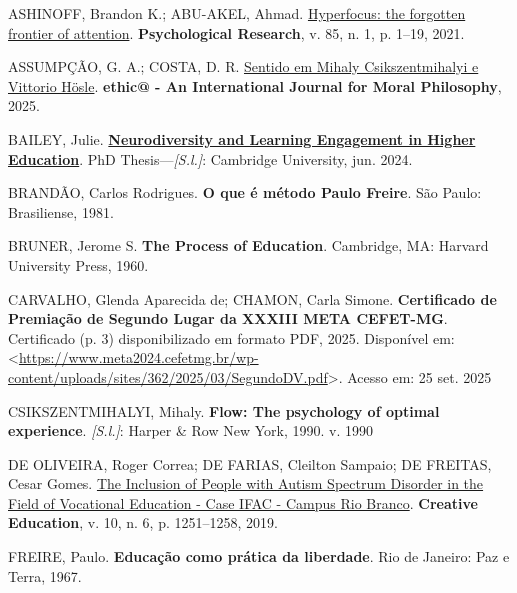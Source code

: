 \documentclass[
  12pt,
  a4paper,
]{article}
\newlength{\cslhangindent}
\newlength{\cslentryspacingunit} %
\newenvironment{CSLReferences}[2] %
 {%
  \setlength{\parindent}{0pt}
  \ifodd #1
  \let\oldpar\par
  \def\par{\hangindent=\cslhangindent\oldpar}
  \fi
  \setlength{\parskip}{#2\cslentryspacingunit}
 }%
 {}
\begin{document}
\hypertarget{refs}{}
\begin{CSLReferences}{0}{1}
\leavevmode{}%
ASHINOFF, Brandon K.; ABU-AKEL, Ahmad.
\href{https://doi.org/10.1007/s00426-019-01245-8}{Hyperfocus: the
forgotten frontier of attention}. \textbf{Psychological Research}, v.
85, n. 1, p. 1--19, 2021.

\leavevmode{}%
ASSUMPÇÃO, G. A.; COSTA, D. R.
\href{https://periodicos.ufsc.br/index.php/ethic/article/view/100953}{Sentido
em Mihaly Csikszentmihalyi e Vittorio Hösle}. \textbf{ethic@ - An
International Journal for Moral Philosophy}, 2025.

\leavevmode{}%
BAILEY, Julie.
\textbf{\href{https://www.repository.cam.ac.uk/handle/1810/375102}{Neurodiversity
and Learning Engagement in Higher Education}}. PhD
Thesis---\emph{{[}S.l.{]}}: Cambridge University, jun. 2024.

\leavevmode{}%
BRANDÃO, Carlos Rodrigues. \textbf{O que é método Paulo Freire}. São
Paulo: Brasiliense, 1981.

\leavevmode{}%
BRUNER, Jerome S. \textbf{The Process of Education}. Cambridge, MA:
Harvard University Press, 1960.

\leavevmode{}%
CARVALHO, Glenda Aparecida de; CHAMON, Carla Simone. \textbf{Certificado
de Premiação de Segundo Lugar da XXXIII META CEFET-MG}. Certificado (p.
3) disponibilizado em formato PDF, 2025. Disponível em:
\textless{}\url{https://www.meta2024.cefetmg.br/wp-content/uploads/sites/362/2025/03/SegundoDV.pdf}\textgreater.
Acesso em: 25 set. 2025

\leavevmode{}%
CSIKSZENTMIHALYI, Mihaly. \textbf{Flow: {The} psychology of optimal
experience}. \emph{{[}S.l.{]}}: Harper \& Row New York, 1990. v. 1990

\leavevmode{}%
DE OLIVEIRA, Roger Correa; DE FARIAS, Cleilton Sampaio; DE FREITAS,
Cesar Gomes. \href{https://doi.org/10.4236/ce.2019.106094}{The Inclusion
of People with Autism Spectrum Disorder in the Field of Vocational
Education - Case IFAC - Campus Rio Branco}. \textbf{Creative Education},
v. 10, n. 6, p. 1251--1258, 2019.

\leavevmode{}%
FREIRE, Paulo. \textbf{Educação como prática da liberdade}. Rio de
Janeiro: Paz e Terra, 1967.


\end{CSLReferences}
\end{document}

